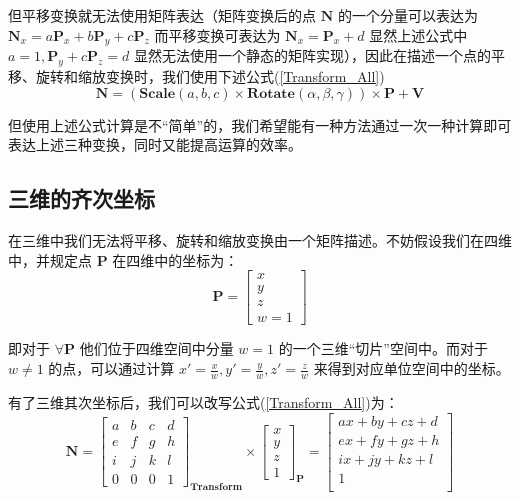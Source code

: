 \documentclass[12pt,oneside,a4paper]{ctexart}
\begin{document}
但平移变换就无法使用矩阵表达（矩阵变换后的点 $\mathbf{N}$ 的一个分量可以表达为 $\mathbf{N}_x=a\mathbf{P}_x+b\mathbf{P}_y+c\mathbf{P}_z$ 而平移变换可表达为 $\mathbf{N}_x=\mathbf{P}_x+d$ 显然上述公式中 $a=1, \mathbf{P}_y+c\mathbf{P}_z=d$ 显然无法使用一个静态的矩阵实现），因此在描述一个点的平移、旋转和缩放变换时，我们使用下述公式(\ref{Transform_All})
\begin{equation}
	\mathbf{N}=
	(
	\mathbf{Scale}(a,b,c)
	\times
	\mathbf{Rotate}(\alpha,\beta,\gamma)
	)\times
	\mathbf{P}
	+
	\mathbf{V}
	\label{Transform_All}
\end{equation}

但使用上述公式计算是不“简单”的，我们希望能有一种方法通过一次一种计算即可表达上述三种变换，同时又能提高运算的效率。
\subsection{三维的齐次坐标}
在三维中我们无法将平移、旋转和缩放变换由一个矩阵描述。不妨假设我们在四维中，并规定点 $\mathbf{P}$ 在四维中的坐标为：
\begin{equation*}
	\mathbf{P}=
	\begin{bmatrix}
		x \\
		y \\
		z \\
		w=1
	\end{bmatrix}
\end{equation*}

即对于 $\forall{}\mathbf{P}$ 他们位于四维空间中分量 $w=1$ 的一个三维“切片”空间中。而对于 $w\neq 1$ 的点，可以通过计算 $x'=\frac{x}{w}, y'=\frac{y}{w}, z'=\frac{z}{w}$ 来得到对应单位空间中的坐标。

有了三维其次坐标后，我们可以改写公式(\ref{Transform_All})为：
\begin{equation}
	\mathbf{N} =
	\begin{bmatrix}
		a & b & c & d \\
		e & f & g & h \\
		i & j & k & l \\
		0 & 0 & 0 & 1
	\end{bmatrix}_{\mathbf{Transform}}
	\times
	\begin{bmatrix}
		x \\
		y \\
		z \\
		1
	\end{bmatrix}_{\mathbf{P}}
	=
	\begin{bmatrix}
		ax+by+cz+d \\
		ex+fy+gz+h \\
		ix+jy+kz+l \\
		1          \\
	\end{bmatrix}
	\label{Transform_All_New}
\end{equation}
\end{document}
